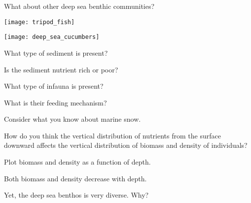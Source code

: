 \documentclass[t]{beamer}
\begin{document}
\begin{frame}[t]{What about other deep sea benthic communities?}

\vspace*{-\baselineskip}

	\begin{multicols}{2}
		{\centering
		\texttt{[image: tripod\_fish]}
		
		\vspace{0.5\baselineskip}
	
		\texttt{[image: deep\_sea\_cucumbers]}
		\par}

	\columnbreak

		\hangpara What type of sediment is present?

		\hangpara Is the sediment nutrient rich or poor?
		
		\hangpara What type of infauna is present?
		
		\hangpara What is their feeding mechanism?

	\end{multicols}

\end{frame}

\begin{frame}[t]{Consider what you know about marine snow.}

\hangpara How do you think the vertical distribution of nutrients from the surface downward affects the vertical distribution of biomass and density of individuals?

\end{frame}

{
\begin{frame}[t]{Plot biomass and density as a function of depth.}

\end{frame}}


{
\begin{frame}[t]{Both biomass and density decrease with depth.}

\vspace*{10\baselineskip}

\hangpara Yet, the deep sea benthos is very diverse. Why?
\end{frame}}
\end{document}
